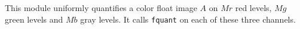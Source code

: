 This module uniformly quantifies a color float image $A$ on $Mr$ red levels,
$Mg$ green levels and $Mb$ gray levels.
It calls \verb+fquant+ on each of these three channels.
